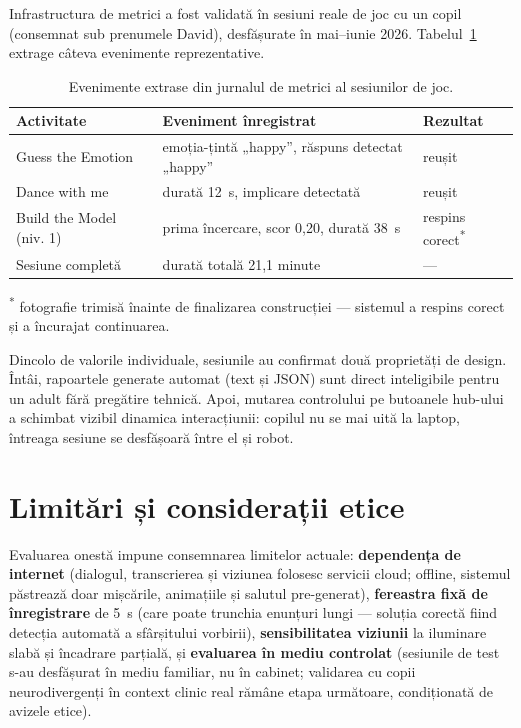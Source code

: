 Infrastructura de metrici a fost validată în sesiuni reale de joc cu un copil (consemnat sub prenumele David), desfășurate în mai--iunie 2026. Tabelul~\ref{tab:sesiuni} extrage câteva evenimente reprezentative.

\begin{table}[htb]
    \centering
    \caption{Evenimente extrase din jurnalul de metrici al sesiunilor de joc.}
    \label{tab:sesiuni}
    \begin{tabular}{|l|>{\raggedright\arraybackslash}p{6cm}|l|}
        \hline
        \textbf{Activitate} & \textbf{Eveniment înregistrat} & \textbf{Rezultat} \\
        \hline
        Guess the Emotion & emoția-țintă „happy”, răspuns detectat „happy” & reușit \\
        Dance with me & durată 12~s, implicare detectată & reușit \\
        Build the Model (niv. 1) & prima încercare, scor 0,20, durată 38~s & respins corect\textsuperscript{*} \\
        Sesiune completă & durată totală 21,1 minute & — \\
        \hline
    \end{tabular}

    \raggedright\footnotesize\textsuperscript{*} fotografie trimisă înainte de finalizarea construcției — sistemul a respins corect și a încurajat continuarea.
\end{table}

Dincolo de valorile individuale, sesiunile au confirmat două proprietăți de design. Întâi, rapoartele generate automat (text și JSON) sunt direct inteligibile pentru un adult fără pregătire tehnică. Apoi, mutarea controlului pe butoanele hub-ului a schimbat vizibil dinamica interacțiunii: copilul nu se mai uită la laptop, întreaga sesiune se desfășoară între el și robot.

\section{Limitări și considerații etice}

Evaluarea onestă impune consemnarea limitelor actuale: \textbf{dependența de internet} (dialogul, transcrierea și viziunea folosesc servicii cloud; offline, sistemul păstrează doar mișcările, animațiile și salutul pre-generat), \textbf{fereastra fixă de înregistrare} de 5~s (care poate trunchia enunțuri lungi — soluția corectă fiind detecția automată a sfârșitului vorbirii), \textbf{sensibilitatea viziunii} la iluminare slabă și încadrare parțială, și \textbf{evaluarea în mediu controlat} (sesiunile de test s-au desfășurat în mediu familiar, nu în cabinet; validarea cu copii neurodivergenți în context clinic real rămâne etapa următoare, condiționată de avizele etice).

